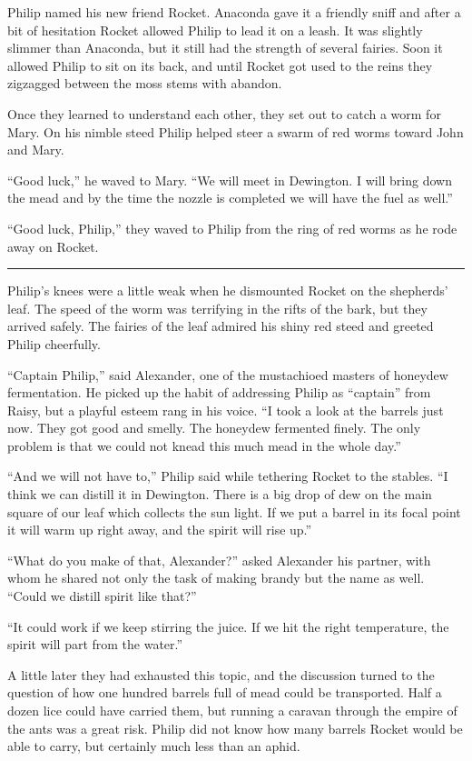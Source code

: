 \documentclass[10pt, draft]{memoir}
\renewcommand{\pfbreakdisplay}{\bigskip \ding{166} \bigskip}
\newcommand{\secbreak}{\fancybreak{\pfbreakdisplay}}
\begin{document}
Philip named his new friend Rocket. Anaconda gave it a friendly sniff and after
a bit of hesitation Rocket allowed Philip to lead it on a leash. It was
slightly slimmer than Anaconda, but it still had the strength of several
fairies. Soon it allowed Philip to sit on its back, and until Rocket got used
to the reins they zigzagged between the moss stems with abandon.

Once they learned to understand each other, they set out to catch a worm for
Mary. On his nimble steed Philip helped steer a swarm of red worms toward John
and Mary.

``Good luck,'' he waved to Mary. ``We will meet in Dewington. I will bring down
the mead and by the time the nozzle is completed we will have the fuel as
well.''

``Good luck, Philip,'' they waved to Philip from the ring of red worms as he
rode away on Rocket.

\secbreak

Philip's knees were a little weak when he dismounted Rocket on the shepherds'
leaf. The speed of the worm was terrifying in the rifts of the bark, but they
arrived safely. The fairies of the leaf admired his shiny red steed and greeted
Philip cheerfully.

``Captain Philip,'' said Alexander, one of the mustachioed masters of honeydew
fermentation. He picked up the habit of addressing Philip as ``captain'' from
Raisy, but a playful esteem rang in his voice. ``I took a look at the barrels
just now. They got good and smelly. The honeydew fermented finely. The only
problem is that we could not knead this much mead in the whole day.''

``And we will not have to,'' Philip said while tethering Rocket to the stables.
``I think we can distill it in Dewington. There is a big drop of dew on the
main square of our leaf which collects the sun light. If we put a barrel in its
focal point it will warm up right away, and the spirit will rise up.''

``What do you make of that, Alexander?'' asked Alexander his partner, with whom
he shared not only the task of making brandy but the name as well. ``Could we
distill spirit like that?''

``It could work if we keep stirring the juice. If we hit the right temperature,
the spirit will part from the water.''

A little later they had exhausted this topic, and the discussion turned to the
question of how one hundred barrels full of mead could be transported. Half a
dozen lice could have carried them, but running a caravan through the empire of
the ants was a great risk. Philip did not know how many barrels Rocket would be
able to carry, but certainly much less than an aphid.
\end{document}
